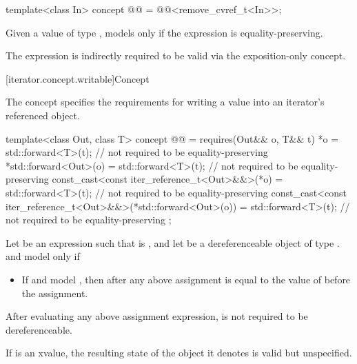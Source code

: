 \begin{codeblock}
template<class In>
  concept @@ =
    @@<remove_cvref_t<In>>;
\end{codeblock}

\pnum
Given a value  of type ,  models 
only if the expression  is equality-preserving.
\begin{note}
The expression  is indirectly required to be valid via the
exposition-only  concept.
\end{note}

[iterator.concept.writable]{Concept }

\pnum
The  concept specifies the requirements
for writing a value into an iterator's referenced object.

\begin{codeblock}
template<class Out, class T>
  concept @@ =
    requires(Out&& o, T&& t) {
      *o = std::forward<T>(t);  // not required to be equality-preserving
      *std::forward<Out>(o) = std::forward<T>(t);   // not required to be equality-preserving
      const_cast<const iter_reference_t<Out>&&>(*o) =
        std::forward<T>(t);     // not required to be equality-preserving
      const_cast<const iter_reference_t<Out>&&>(*std::forward<Out>(o)) =
        std::forward<T>(t);     // not required to be equality-preserving
    };
\end{codeblock}

\pnum
Let  be an expression such that  is ,
and let  be a dereferenceable object of type .
 and  model  only if
\begin{itemize}
\item If  and  model
  ,
  then  after any above assignment is equal to
  the value of  before the assignment.
\end{itemize}

\pnum
After evaluating any above assignment expression,  is not required to be dereferenceable.

\pnum
If  is an xvalue, the resulting
state of the object it denotes is valid but unspecified.

